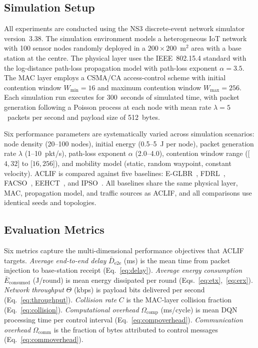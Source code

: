 \documentclass[a4paper]{cas-dc}
\numberwithin{equation}{section}
\begin{document}

\subsection{Simulation Setup}
\label{subsec:simsetup}

All experiments are conducted using the NS3 discrete-event network simulator
version~3.38. The simulation environment models a heterogeneous IoT network
with 100 sensor nodes randomly deployed in a $200 \times 200$~m$^2$ area with
a base station at the centre. The physical layer uses the IEEE~802.15.4
standard with the log-distance path-loss propagation model with path-loss
exponent $\alpha = 3.5$. The MAC layer employs a CSMA/CA access-control scheme
with initial contention window $W_{\min}=16$ and maximum contention window
$W_{\max}=256$. Each simulation run executes for 300~seconds of simulated time,
with packet generation following a Poisson process at each node with mean rate
$\lambda = 5$~packets per second and payload size of 512~bytes.

Six performance parameters are systematically varied across simulation
scenarios: node density (20–100 nodes), initial energy (0.5–5~J per node),
packet generation rate $\lambda$ (1–10~pkt/s), path-loss exponent $\alpha$
(2.0–4.0), contention window range ([$4,32$] to [$16,256$]), and mobility model
(static, random waypoint, constant velocity). ACLIF is compared against five
baselines: E-GLBR~\cite{Benelhouri2023}, FDRL~\cite{Suresh2024},
FACSO~\cite{Yang2024204}, EEHCT~\cite{Chaurasiya202325941}, and
IPSO~\cite{Zhang2025}. All baselines share the same physical layer, MAC,
propagation model, and traffic sources as ACLIF, and all comparisons use
identical seeds and topologies.

\subsection{Evaluation Metrics}
\label{subsec:metrics}

Six metrics capture the multi-dimensional performance objectives that ACLIF
targets. \emph{Average end-to-end delay} $\bar{D}_{\text{e2e}}$ (ms) is the
mean time from packet injection to base-station receipt
(Eq.~\ref{eq:delay}). \emph{Average energy consumption}
$\bar{E}_{\text{consumed}}$ (J/round) is mean energy dissipated per round
(Eqs.~\ref{eq:etx},~\ref{eq:erx}). \emph{Network throughput} $\Theta$ (kbps)
is payload bits delivered per second (Eq.~\ref{eq:throughput}).
\emph{Collision rate} $C$ is the MAC-layer collision fraction
(Eq.~\ref{eq:collision}). \emph{Computational overhead}
$\Omega_{\text{comp}}$ (ms/cycle) is mean DQN processing time per control
interval (Eq.~\ref{eq:compoverhead}). \emph{Communication overhead}
$\Omega_{\text{comm}}$ is the fraction of bytes attributed to control
messages (Eq.~\ref{eq:commoverhead}).
\end{document}
